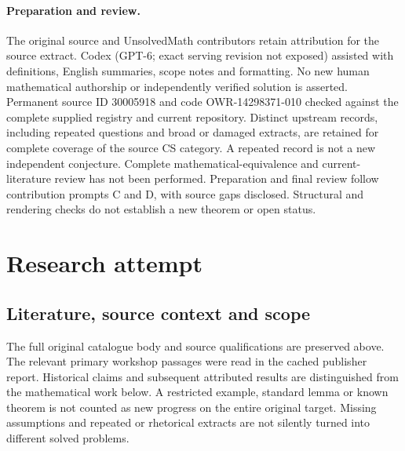 \documentclass[11pt]{article}
\begin{document}
\paragraph{Preparation and review.}
The original source and UnsolvedMath contributors retain attribution for the source extract. Codex (GPT-6; exact serving revision not exposed) assisted with definitions, English summaries, scope notes and formatting. No new human mathematical authorship or independently verified solution is asserted. Permanent source ID 30005918 and code OWR-14298371-010 checked against the complete supplied registry and current repository. Distinct upstream records, including repeated questions and broad or damaged extracts, are retained for complete coverage of the source CS category. A repeated record is not a new independent conjecture. Complete mathematical-equivalence and current-literature review has not been performed. Preparation and final review follow contribution prompts C and D, with source gaps disclosed. Structural and rendering checks do not establish a new theorem or open status.
\label{end:30005918}

\section{Research attempt}
\subsection{Literature, source context and scope}
The full original catalogue body and source qualifications are preserved above. The relevant primary workshop passages were read in the cached publisher report. Historical claims and subsequent attributed results are distinguished from the mathematical work below. A restricted example, standard lemma or known theorem is not counted as new progress on the entire original target. Missing assumptions and repeated or rhetorical extracts are not silently turned into different solved problems.
\end{document}

